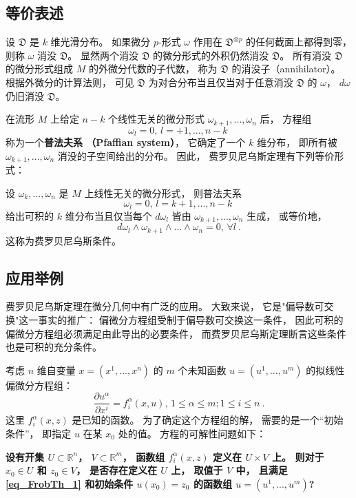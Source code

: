 \subsection{等价表述}
设 $\mathfrak{D}$ 是 $k$ 维光滑分布。 如果微分 $p$-形式 $\omega$ 作用在 $\mathfrak{D}^{\otimes p}$ 的任何截面上都得到零， 则称 $\omega$ 消没 $\mathfrak{D}$。 显然两个消没 $\mathfrak{D}$ 的微分形式的外积仍然消没 $\mathfrak{D}$。 所有消没 $\mathfrak{D}$ 的微分形式组成 $M$ 的外微分代数的子代数， 称为 $\mathfrak{D}$ 的消没子（annihilator）。 根据外微分的计算法则， 可见 $\mathfrak{D}$ 为对合分布当且仅当对于任意消没 $\mathfrak{D}$ 的 $\omega$， $d\omega$ 仍旧消没 $\mathfrak{D}$。 

在流形 $M$ 上给定 $n-k$ 个线性无关的微分形式 $\omega_{k+1},...,\omega_{n}$ 后， 方程组
$$
\omega_{l}=0,\,l=+1,...,n-k~
$$
称为一个\textbf{普法夫系 （Pfaffian system）}， 它确定了一个 $k$ 维分布， 即所有被 $\omega_{k+1},...,\omega_{n}$ 消没的子空间给出的分布。 因此， 费罗贝尼乌斯定理有下列等价形式：
\begin{theorem}{}
设 $\omega_{k},...,\omega_{n}$ 是 $M$ 上线性无关的微分形式， 则普法夫系
$$
\omega_{l}=0,\,l=k+1,...,n-k~
$$
给出可积的 $k$ 维分布当且仅当每个 $d\omega_l$ 皆由 $\omega_{k+1},...,\omega_{n}$ 生成， 或等价地，
$$
d\omega_{l}\wedge\omega_{k+1}\wedge...\wedge\omega_{n}=0,\,\forall l~.
$$
这称为费罗贝尼乌斯条件。
\end{theorem}

\subsection{应用举例}
费罗贝尼乌斯定理在微分几何中有广泛的应用。 大致来说， 它是"偏导数可交换"这一事实的推广： 偏微分方程组受制于偏导数可交换这一条件， 因此可积的偏微分方程组必须满足由此导出的必要条件， 而费罗贝尼乌斯定理断言这些条件也是可积的充分条件。

考虑 $n$ 维自变量 $x=(x^1,...,x^n)$ 的 $m$ 个未知函数 $u=(u^1,...,u^m)$ 的拟线性偏微分方程组：
\begin{equation}\label{eq_FrobTh_1}
\frac{\partial u^\alpha}{\partial x^i}=f_i^\alpha(x,u),\,1\leq\alpha\leq m;1\leq i\leq n~.
\end{equation}
这里 $f_i^\alpha(x,z)$ 是已知的函数。 为了确定这个方程组的解， 需要的是一个“初始条件”， 即指定 $u$ 在某 $x_0$ 处的值。 方程的可解性问题如下：

\textbf{设有开集 $U\subset\mathbb{R}^n$， $V\subset\mathbb{R}^m$， 函数组 $f_i^\alpha(x,z)$ 定义在 $U\times V$ 上。 则对于 $x_0\in U$ 和 $z_0\in V$， 是否存在定义在 $U$ 上， 取值于 $V$ 中， 且满足\autoref{eq_FrobTh_1} 和初始条件 $u(x_0)=z_0$ 的函数组 $u=(u^1,...,u^m)$?}

